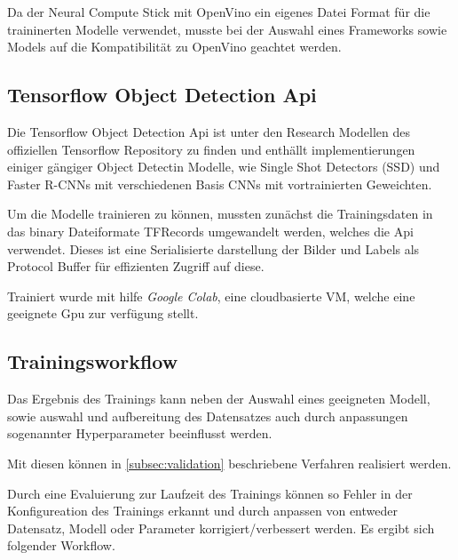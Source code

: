 Da der Neural Compute Stick mit OpenVino ein eigenes Datei Format 
für die traininerten Modelle verwendet, musste bei der Auswahl
eines Frameworks sowie Models auf die Kompatibilität zu OpenVino 
geachtet werden. 



\subsection{Tensorflow Object Detection Api}

Die Tensorflow Object Detection Api ist unter den Research Modellen
\cite{tfobjdet} des offiziellen Tensorflow Repository zu
finden und enthällt implementierungen einiger gängiger Object Detectin
Modelle, wie Single Shot Detectors (SSD) und Faster R-CNNs mit 
verschiedenen Basis CNNs mit vortrainierten Geweichten.

Um die Modelle trainieren zu können, mussten zunächst die 
Trainingsdaten in das binary Dateiformate TFRecords umgewandelt 
werden, welches die Api verwendet. Dieses ist eine Serialisierte 
darstellung der Bilder und Labels als Protocol Buffer für
effizienten Zugriff auf diese.

Trainiert wurde mit hilfe \textit{Google Colab}, eine cloudbasierte VM,
welche eine geeignete Gpu zur verfügung stellt.


\subsection{Trainingsworkflow}

Das Ergebnis des Trainings kann neben der Auswahl eines geeigneten 
Modell, sowie auswahl und aufbereitung des Datensatzes auch durch 
anpassungen sogenannter Hyperparameter beeinflusst werden.

Mit diesen können in \ref{subsec:validation} beschriebene 
Verfahren realisiert werden.

Durch eine Evaluierung zur Laufzeit des Trainings können so Fehler 
in der Konfigureation des Trainings erkannt und durch anpassen von 
entweder Datensatz, Modell oder Parameter korrigiert/verbessert 
werden.
Es ergibt sich folgender Workflow.

